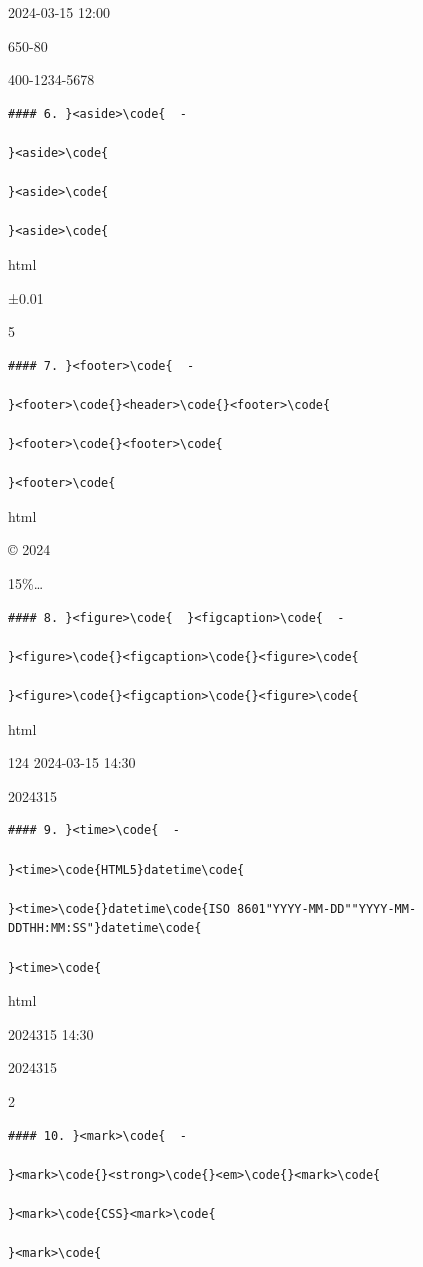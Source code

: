 2024-03-15 12:00

650-80

400-1234-5678

\begin{lstlisting}
#### 6. }<aside>\code{  - 

}<aside>\code{

}<aside>\code{

}<aside>\code{

\end{lstlisting}

html

±0.01

5

\begin{lstlisting}
#### 7. }<footer>\code{  - 

}<footer>\code{}<header>\code{}<footer>\code{

}<footer>\code{}<footer>\code{

}<footer>\code{

\end{lstlisting}

html

© 2024

15\%\ldots{}

\begin{lstlisting}
#### 8. }<figure>\code{  }<figcaption>\code{  - 

}<figure>\code{}<figcaption>\code{}<figure>\code{

}<figure>\code{}<figcaption>\code{}<figure>\code{

\end{lstlisting}

html

124 \textbar{} 2024-03-15 14:30

2024315 \textbar{}

\begin{lstlisting}
#### 9. }<time>\code{  - 

}<time>\code{HTML5}datetime\code{

}<time>\code{}datetime\code{ISO 8601"YYYY-MM-DD""YYYY-MM-DDTHH:MM:SS"}datetime\code{

}<time>\code{

\end{lstlisting}

html

2024315 14:30

2024315

2

\begin{lstlisting}
#### 10. }<mark>\code{  - 

}<mark>\code{}<strong>\code{}<em>\code{}<mark>\code{

}<mark>\code{CSS}<mark>\code{

}<mark>\code{

\end{lstlisting}

